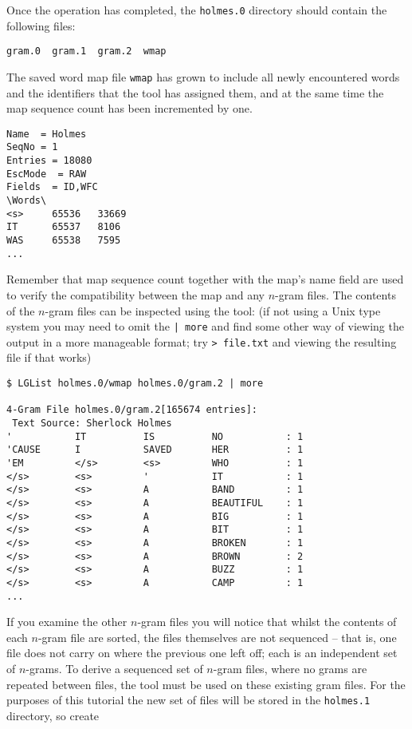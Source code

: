 Once the operation has completed, the \texttt{holmes.0} directory should
contain the following files:
\begin{verbatim}
gram.0  gram.1  gram.2  wmap
\end{verbatim}
The saved word map file \texttt{wmap} has grown to include all newly
encountered words and the identifiers that the tool has assigned them,
and at the same time the map sequence count has been incremented by
one.
\begin{verbatim}
Name  = Holmes
SeqNo = 1
Entries = 18080
EscMode  = RAW
Fields  = ID,WFC
\Words\
<s>     65536   33669
IT      65537   8106
WAS     65538   7595
...
\end{verbatim}
Remember that map sequence count together with the map's name field
are used to verify the compatibility between the map and any $n$-gram
files.  The contents of the $n$-gram files can be inspected using the
\htool{LGList} tool:  (if not using a Unix type system you may need to
omit the {\tt | more} and find some other way of viewing the output in
a more manageable format; try {\tt > file.txt} and viewing the
resulting file if that works)
\begin{verbatim}
$ LGList holmes.0/wmap holmes.0/gram.2 | more

4-Gram File holmes.0/gram.2[165674 entries]:
 Text Source: Sherlock Holmes
'           IT          IS          NO           : 1
'CAUSE      I           SAVED       HER          : 1
'EM         </s>        <s>         WHO          : 1
</s>        <s>         '           IT           : 1
</s>        <s>         A           BAND         : 1
</s>        <s>         A           BEAUTIFUL    : 1
</s>        <s>         A           BIG          : 1
</s>        <s>         A           BIT          : 1
</s>        <s>         A           BROKEN       : 1
</s>        <s>         A           BROWN        : 2
</s>        <s>         A           BUZZ         : 1
</s>        <s>         A           CAMP         : 1
...
\end{verbatim} %
If you examine the other $n$-gram files you will notice that whilst
the contents of each $n$-gram file are sorted, the files themselves
are not sequenced -- that is, one file does not carry on where the
previous one left off; each is an independent set of $n$-grams.  To
derive a sequenced set of $n$-gram files, where no grams are repeated
between files, the tool \htool{LGCopy} must be used on these existing
gram files.  For the purposes of this tutorial the new set of
files will be stored in the \texttt{holmes.1} directory, so create

